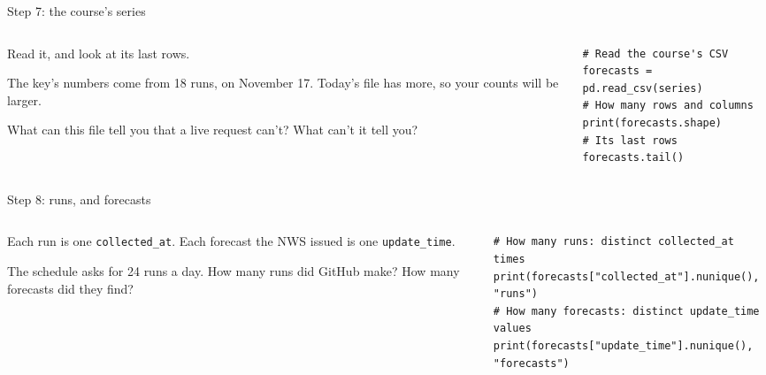 \documentclass[9pt,aspectratio=169]{beamer}
\begin{document}
\begin{frame}[fragile]{Step 7: the course's series}
    \begin{columns}[T]
        \begin{column}{0.37\textwidth}
            Read it, and look at its last rows.

            \medskip
            The key's numbers come from 18 runs, on November 17. Today's file has more, so your counts will be larger.

            \medskip
            What can this file tell you that a live request can't? What can't it tell you?
        \end{column}
        \begin{column}{0.6\textwidth}
\begin{lstlisting}
# Read the course's CSV
forecasts = pd.read_csv(series)
# How many rows and columns
print(forecasts.shape)
# Its last rows
forecasts.tail()
\end{lstlisting}
        \end{column}
    \end{columns}
\end{frame}

\begin{frame}[fragile]{Step 8: runs, and forecasts}
    \begin{columns}[T]
        \begin{column}{0.37\textwidth}
            Each run is one \texttt{collected\_at}. Each forecast the NWS issued is one \texttt{update\_time}.

            \medskip
            The schedule asks for 24 runs a day. How many runs did GitHub make? How many forecasts did they find?
        \end{column}
        \begin{column}{0.6\textwidth}
\begin{lstlisting}
# How many runs: distinct collected_at times
print(forecasts["collected_at"].nunique(), "runs")
# How many forecasts: distinct update_time values
print(forecasts["update_time"].nunique(), "forecasts")
\end{lstlisting}
        \end{column}
    \end{columns}
\end{frame}
\end{document}
